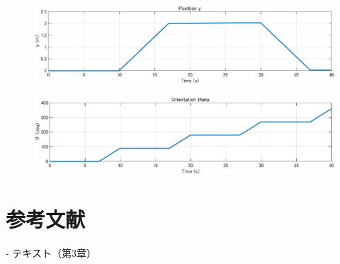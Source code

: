 \documentclass[10pt,a4paper,titlepage]{jreport} %
\begin{document}
\begin{figure}[H] %
  \centering
  \includegraphics[width=0.6\linewidth]{242C2016_NaoOkumura_3_5_c.eps} %
\end{figure}

\begin{figure}[H] %
  \centering
  \includegraphics[width=0.6\linewidth]{242C2016_NaoOkumura_3_5_d.eps} %
\end{figure}

\chapter{参考文献}

- テキスト（第3章）
\end{document}
